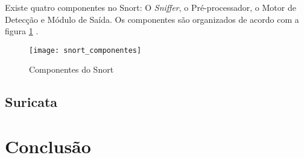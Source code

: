 Existe quatro componentes no Snort: O \textit{Sniffer}, o Pré-processador, o Motor de Detecção e Módulo de Saída. Os componentes são organizados de acordo com a figura \ref{snort-componentes} \cite{kohlenberg2007snort}.

 \begin{figure}[!htb]
   \centering
   \texttt{[image: snort\_componentes]}
   \caption{Componentes do Snort}
   \label{snort-componentes}
 \end{figure}

 \subsection{Suricata} \label{sec:suricata}
 \section{Conclusão} \label{sec:idps-conclusao}


